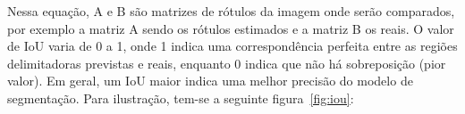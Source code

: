 Nessa equação, A e B são matrizes de rótulos da imagem onde serão
comparados, por exemplo a matriz A sendo os rótulos estimados e a
matriz B os reais. O valor de IoU varia de 0 a 1, onde 1 indica uma
correspondência perfeita entre as regiões delimitadoras previstas e
reais, enquanto 0 indica que não há sobreposição (pior valor). Em
geral, um IoU maior indica uma melhor precisão do modelo de
segmentação. Para ilustração, tem-se a seguinte figura~\ref{fig:iou}:

\begin{figure}[h!]
        \captionsetup{width=12cm}
		\centering
\end{figure}
\FloatBarrier{}
